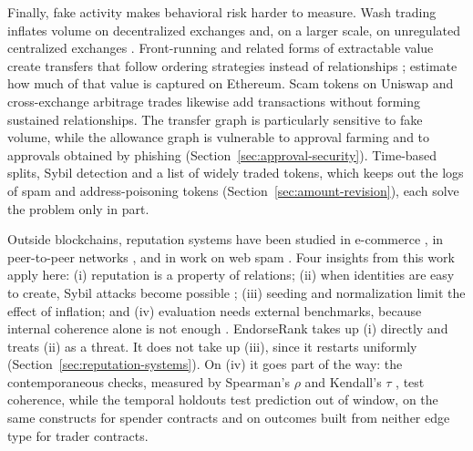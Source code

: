 Finally, fake activity makes behavioral risk harder to measure. Wash trading inflates volume on decentralized exchanges \parencite{victor2021washtrading} and, on a larger scale, on unregulated centralized exchanges \parencite{cong2023washtrading}. Front-running and related forms of extractable value create transfers that follow ordering strategies instead of relationships \parencite{daian2020flashboys}; \textcite{qin2022bev} estimate how much of that value is captured on Ethereum. Scam tokens on Uniswap \parencite{xia2021scamtokens} and cross-exchange arbitrage trades \parencite{makarov2020arbitrage} likewise add transactions without forming sustained relationships. The transfer graph is particularly sensitive to fake volume, while the allowance graph is vulnerable to approval farming and to approvals obtained by phishing (Section~\ref{sec:approval-security}). Time-based splits, Sybil detection and a list of widely traded tokens, which keeps out the logs of spam and address-poisoning tokens (Section~\ref{sec:amount-revision}), each solve the problem only in part.


Outside blockchains, reputation systems have been studied in e-commerce \parencite{resnick2002trust}, in peer-to-peer networks \parencite{kamvar2003eigentrust}, and in work on web spam \parencite{gyongyi2004trustrank}. Four insights from this work apply here: (i) reputation is a property of relations; (ii) when identities are easy to create, Sybil attacks become possible \parencite{douceur2002sybil}; (iii) seeding and normalization limit the effect of inflation; and (iv) evaluation needs external benchmarks, because internal coherence alone is not enough \parencite{cronbach1955construct}. EndorseRank takes up (i) directly and treats (ii) as a threat. It does not take up (iii), since it restarts uniformly (Section~\ref{sec:reputation-systems}). On (iv) it goes part of the way: the contemporaneous checks, measured by Spearman's $\rho$ \parencite{spearman1904proof} and Kendall's $\tau$ \parencite{kendall1938rank}, test coherence, while the temporal holdouts test prediction out of window, on the same constructs for spender contracts and on outcomes built from neither edge type for trader contracts.

